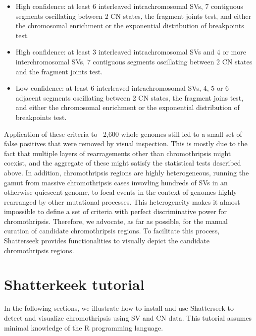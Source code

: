 \documentclass[twoside,a4wide,11pt]{article}\usepackage[]{graphicx}\usepackage[]{color}
\begin{document}
\begin{itemize}

\item High confidence: at least 6 interleaved intrachromosomal SVs, 7 contiguous segments oscillating between 2 CN states, 
the fragment joints test, and either the chromosomal enrichment or the exponential distribution of breakpoints test.

\item High confidence: at least 3 interleaved intrachromosomal SVs and 4 or more interchromosomal SVs, 7 contiguous segments oscillating between 2 CN states and the fragment joints test.

\item Low confidence: at least 6 interleaved intrachromosomal SVs, 4, 5 or 6 adjacent segments oscillating between 2 CN states, the fragment joins test, and either the chromosomal enrichment or the exponential distribution of breakpoints test.

\end{itemize}

Application of these criteria to ~2,600 whole genomes still led to a small set of false positives that were removed by visual inspection. 
This is mostly due to the fact that multiple layers of rearragements other than chromothripsis might coexist, and the aggregate of these might satisfy the statistical tests described above.
In addition, chromothripsis regions are highly heterogeneous, running the gamut from massive chromothripsis cases 
invovling hundreds of SVs in an otherwise quiescent genome, 
to focal events in the context of genomes highly rearranged by other mutational processes.
This heterogeneity makes it almost impossible to define a set of criteria with perfect
discriminative power for chromothripsis.
Therefore, we advocate, as far as possible, for the manual curation of candidate chromothripsis regions. 
To facilitate this process, Shatterseek provides functionalities to visually depict the candidate chromothripsis regions. 


\section{Shatterkeek tutorial}
In the following sections, we illustrate how to install and use Shatterseek to detect and visualize chromothripsis 
using SV and CN data. 
This tutorial assumes minimal knowledge of the R programming language.
\end{document}
